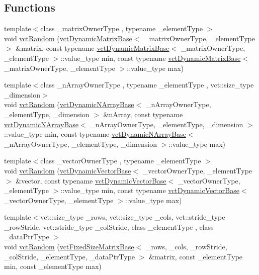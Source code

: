 \subsection*{Functions}
\begin{DoxyCompactItemize}
\item 
{\footnotesize template$<$class \-\_\-matrix\-Owner\-Type , typename \-\_\-element\-Type $>$ }\\void \hyperlink{group__cisst_vector_ga0d25660a2dc6ef9c093f6f6b2804d2d0}{vct\-Random} (\hyperlink{classvct_dynamic_matrix_base}{vct\-Dynamic\-Matrix\-Base}$<$ \-\_\-matrix\-Owner\-Type, \-\_\-element\-Type $>$ \&matrix, const typename \hyperlink{classvct_dynamic_matrix_base}{vct\-Dynamic\-Matrix\-Base}$<$ \-\_\-matrix\-Owner\-Type, \-\_\-element\-Type $>$\-::value\-\_\-type min, const typename \hyperlink{classvct_dynamic_matrix_base}{vct\-Dynamic\-Matrix\-Base}$<$ \-\_\-matrix\-Owner\-Type, \-\_\-element\-Type $>$\-::value\-\_\-type max)
\item 
{\footnotesize template$<$class \-\_\-n\-Array\-Owner\-Type , typename \-\_\-element\-Type , vct\-::size\-\_\-type \-\_\-dimension$>$ }\\void \hyperlink{group__cisst_vector_gaebf3255543621d7ad303e4a6d381b32d}{vct\-Random} (\hyperlink{classvct_dynamic_n_array_base}{vct\-Dynamic\-N\-Array\-Base}$<$ \-\_\-n\-Array\-Owner\-Type, \-\_\-element\-Type, \-\_\-dimension $>$ \&n\-Array, const typename \hyperlink{classvct_dynamic_n_array_base}{vct\-Dynamic\-N\-Array\-Base}$<$ \-\_\-n\-Array\-Owner\-Type, \-\_\-element\-Type, \-\_\-dimension $>$\-::value\-\_\-type min, const typename \hyperlink{classvct_dynamic_n_array_base}{vct\-Dynamic\-N\-Array\-Base}$<$ \-\_\-n\-Array\-Owner\-Type, \-\_\-element\-Type, \-\_\-dimension $>$\-::value\-\_\-type max)
\item 
{\footnotesize template$<$class \-\_\-vector\-Owner\-Type , typename \-\_\-element\-Type $>$ }\\void \hyperlink{group__cisst_vector_ga2d450588b013a15e9b92489bcb7c59d1}{vct\-Random} (\hyperlink{classvct_dynamic_vector_base}{vct\-Dynamic\-Vector\-Base}$<$ \-\_\-vector\-Owner\-Type, \-\_\-element\-Type $>$ \&vector, const typename \hyperlink{classvct_dynamic_vector_base}{vct\-Dynamic\-Vector\-Base}$<$ \-\_\-vector\-Owner\-Type, \-\_\-element\-Type $>$\-::value\-\_\-type min, const typename \hyperlink{classvct_dynamic_vector_base}{vct\-Dynamic\-Vector\-Base}$<$ \-\_\-vector\-Owner\-Type, \-\_\-element\-Type $>$\-::value\-\_\-type max)
\item 
{\footnotesize template$<$vct\-::size\-\_\-type \-\_\-rows, vct\-::size\-\_\-type \-\_\-cols, vct\-::stride\-\_\-type \-\_\-row\-Stride, vct\-::stride\-\_\-type \-\_\-col\-Stride, class \-\_\-element\-Type , class \-\_\-data\-Ptr\-Type $>$ }\\void \hyperlink{group__cisst_vector_ga51016885c0db42365f594f909b6e148c}{vct\-Random} (\hyperlink{classvct_fixed_size_matrix_base}{vct\-Fixed\-Size\-Matrix\-Base}$<$ \-\_\-rows, \-\_\-cols, \-\_\-row\-Stride, \-\_\-col\-Stride, \-\_\-element\-Type, \-\_\-data\-Ptr\-Type $>$ \&matrix, const \-\_\-element\-Type min, const \-\_\-element\-Type max)

\end{DoxyCompactItemize}
